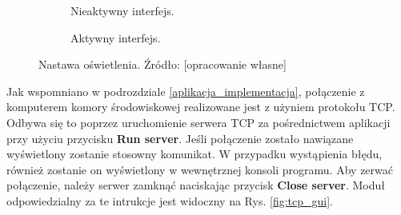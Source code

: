 \begin{figure}[h]
	\centering
	
	\begin{subfigure}[h]{.49\textwidth}
		\centering
		\setlength{\fboxsep}{0pt}
		\setlength{\fboxrule}{1pt}
		\caption{Nieaktywny interfejs.}
		\label{fig:oswietlacz_gui_nieaktywne}
	\end{subfigure}
	\hfill%
	\begin{subfigure}[h]{.49\textwidth}
		\centering
		\setlength{\fboxsep}{0pt}
		\setlength{\fboxrule}{1pt}
		\caption{Aktywny interfejs.} 
		\label{fig:oswietlacz_gui_aktywne}
	\end{subfigure}
	
	\caption{Nastawa oświetlenia. Źródło: [opracowanie własne]}
	\label{fig:oswietlacz_gui}
		
\end{figure}
Jak wspomniano w podrozdziale \ref{aplikacja_implementacja}, połączenie z komputerem komory środowiskowej realizowane jest z użyniem protokołu TCP. Odbywa się to poprzez uruchomienie serwera TCP za pośrednictwem aplikacji przy użyciu przycisku \textbf{Run server}. Jeśli połączenie zostało nawiązane wyświetlony zostanie stosowny komunikat. W przypadku wystąpienia błędu, również zostanie on wyświetlony w wewnętrznej konsoli programu. Aby zerwać połączenie, należy serwer zamknąć naciskając przycisk \textbf{Close server}. Moduł odpowiedzialny za te intrukcje jest widoczny na Rys. \ref{fig:tcp_gui}.\\

